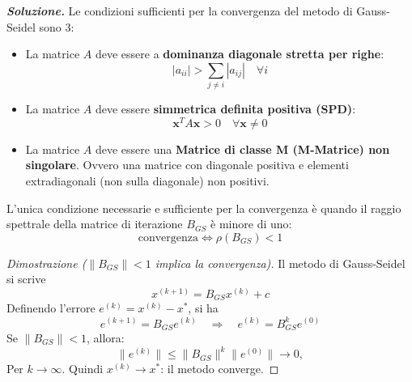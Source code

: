 \begin{enumerate}
    \textcolor{Green3}{\textbf{\emph{Soluzione.}}} Le condizioni sufficienti per la convergenza del metodo di Gauss-Seidel sono 3:
    \begin{itemize}
        \item La matrice $A$ deve essere a \textbf{dominanza diagonale stretta per righe}:
        \begin{equation*}
            \left|a_{ii}\right| > \displaystyle\sum_{j \ne i} \left|a_{ij}\right| \hspace{1em} \forall i
        \end{equation*}
        \item La matrice $A$ deve essere \textbf{simmetrica definita positiva (SPD)}:
        \begin{equation*}
            \mathbf{x}^{T} A \mathbf{x} > 0 \hspace{1em} \forall \mathbf{x} \ne 0
        \end{equation*}
        \item La matrice $A$ deve essere una \textbf{Matrice di classe M (M-Matrice) non singolare}. Ovvero una matrice con diagonale positiva e elementi extradiagonali (non sulla diagonale) non positivi.
    \end{itemize}
    L'unica condizione necessarie e sufficiente per la convergenza è quando il raggio spettrale della matrice di iterazione $B_{GS}$ è minore di uno:
    \begin{equation*}
        \text{convergenza} \iff \rho(B_{GS}) < 1
    \end{equation*}
    \begin{proof}[Dimostrazione ($\left\| B_{GS} \right\| < 1$ implica la convergenza)]
        Il metodo di Gauss-Seidel si scrive
        \begin{equation*}
            x^{(k+1)} = B_{GS}x^{(k)} + c
        \end{equation*}
        Definendo l'errore $e^{(k)} = x^{(k)} - x^{*}$, si ha
        \begin{equation*}
            e^{(k+1)} = B_{GS} e^{(k)} \quad \Rightarrow \quad e^{(k)} = B_{GS}^k e^{(0)}
        \end{equation*}
        Se $\|B_{GS}\| < 1$, allora:
        \begin{equation*}
            \|e^{(k)}\| \le \|B_{GS}\|^k \|e^{(0)}\| \to 0,
        \end{equation*}
        Per $k \to \infty$. Quindi $x^{(k)} \to x^\ast$: il metodo converge.
    \end{proof}



\end{enumerate}
